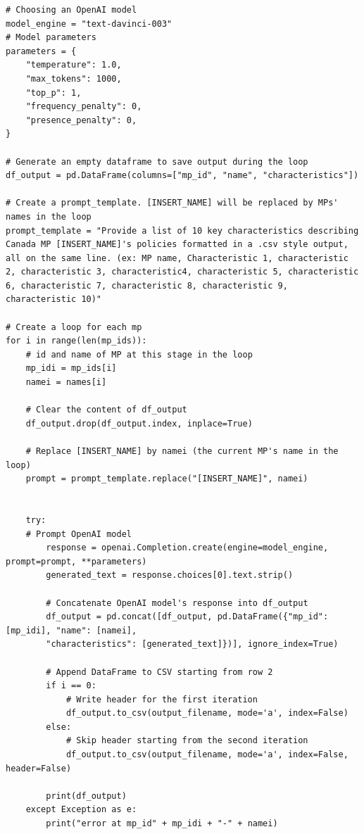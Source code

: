 \documentclass{article}
\begin{document}
\begin{verbatim}
# Choosing an OpenAI model
model_engine = "text-davinci-003"
# Model parameters
parameters = {
    "temperature": 1.0,
    "max_tokens": 1000,
    "top_p": 1,
    "frequency_penalty": 0,
    "presence_penalty": 0,
}

# Generate an empty dataframe to save output during the loop
df_output = pd.DataFrame(columns=["mp_id", "name", "characteristics"])

# Create a prompt_template. [INSERT_NAME] will be replaced by MPs' names in the loop
prompt_template = "Provide a list of 10 key characteristics describing Canada MP [INSERT_NAME]'s policies formatted in a .csv style output, all on the same line. (ex: MP name, Characteristic 1, characteristic 2, characteristic 3, characteristic4, characteristic 5, characteristic 6, characteristic 7, characteristic 8, characteristic 9, characteristic 10)"

# Create a loop for each mp
for i in range(len(mp_ids)):
    # id and name of MP at this stage in the loop
    mp_idi = mp_ids[i]
    namei = names[i]
    
    # Clear the content of df_output
    df_output.drop(df_output.index, inplace=True)

    # Replace [INSERT_NAME] by namei (the current MP's name in the loop)
    prompt = prompt_template.replace("[INSERT_NAME]", namei)

    
    try:
    # Prompt OpenAI model
        response = openai.Completion.create(engine=model_engine, prompt=prompt, **parameters)
        generated_text = response.choices[0].text.strip()

        # Concatenate OpenAI model's response into df_output
        df_output = pd.concat([df_output, pd.DataFrame({"mp_id": [mp_idi], "name": [namei],
        "characteristics": [generated_text]})], ignore_index=True)

        # Append DataFrame to CSV starting from row 2
        if i == 0:
            # Write header for the first iteration
            df_output.to_csv(output_filename, mode='a', index=False)
        else:
            # Skip header starting from the second iteration
            df_output.to_csv(output_filename, mode='a', index=False, header=False)

        print(df_output)
    except Exception as e:
        print("error at mp_id" + mp_idi + "-" + namei)
\end{verbatim}
\end{document}
